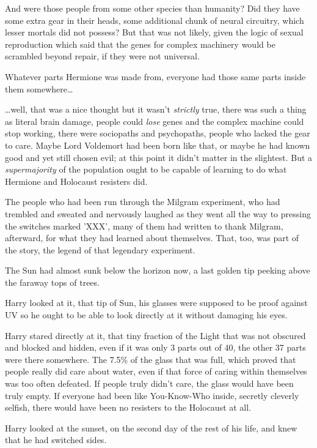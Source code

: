 And were those people from some other species than humanity? Did they have some 
extra gear in their heads, some additional chunk of neural circuitry, which 
lesser mortals did not possess? But that was not likely, given the logic of 
sexual reproduction which said that the genes for complex machinery would be 
scrambled beyond repair, if they were not universal.

Whatever parts Hermione was made from, everyone had those same parts inside 
them somewhere{\ldots}

{\ldots}well, that was a nice thought but it wasn't \emph{strictly} true, there 
was such a thing as literal brain damage, people could \emph{lose} genes and 
the complex machine could stop working, there were sociopaths and psychopaths, 
people who lacked the gear to care. Maybe Lord Voldemort had been born like 
that, or maybe he had known good and yet still chosen evil; at this point it 
didn't matter in the slightest. But a \emph{supermajority} of the population 
ought to be capable of learning to do what Hermione and Holocaust resisters did.

The people who had been run through the Milgram experiment, who had trembled 
and sweated and nervously laughed as they went all the way to pressing the 
switches marked 'XXX', many of them had written to thank Milgram, afterward, 
for what they had learned about themselves. That, too, was part of the story, 
the legend of that legendary experiment.

The Sun had almost sunk below the horizon now, a last golden tip peeking above 
the faraway tops of trees.

Harry looked at it, that tip of Sun, his glasses were supposed to be proof 
against UV so he ought to be able to look directly at it without damaging his 
eyes.

Harry stared directly at it, that tiny fraction of the Light that was not 
obscured and blocked and hidden, even if it was only 3 parts out of 40, the 
other 37 parts were there somewhere. The 7.5\% of the glass that was full, which 
proved that people really did care about water, even if that force of caring 
within themselves was too often defeated. If people truly didn't care, the 
glass would have been truly empty. If everyone had been like You-Know-Who 
inside, secretly cleverly selfish, there would have been no resisters to the 
Holocaust at all.

Harry looked at the sunset, on the second day of the rest of his life, and knew 
that he had switched sides.

